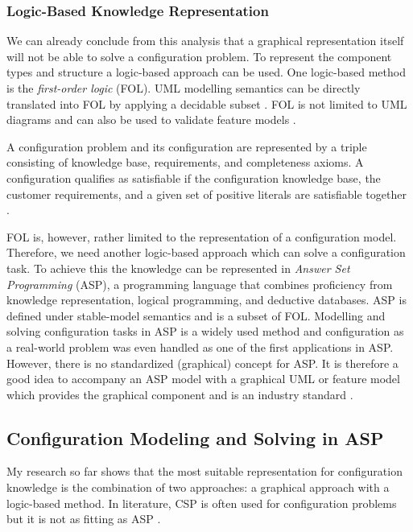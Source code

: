 \subsubsection{Logic-Based Knowledge Representation}

We can already conclude from this analysis that a graphical representation itself will not be able to solve a configuration problem. To represent the component types and structure a logic-based approach can be used. One logic-based method is the \textit{first-order logic} (FOL). UML modelling semantics can be directly translated into FOL by applying a decidable subset \cite{hofestrybawo14a}. FOL is not limited to UML diagrams and can also be used to validate feature models \cite{elphho09a}. \newline

A configuration problem and its configuration are represented by a triple consisting of knowledge base, requirements, and completeness axioms. A configuration qualifies as satisfiable if the configuration knowledge base, the customer requirements, and a given set of positive literals are satisfiable together \cite{hofestrybawo14a}. \newline

FOL is, however, rather limited to the representation of a configuration model. Therefore, we need another logic-based approach which can solve a configuration task. To achieve this the knowledge can be represented in \textit{Answer Set Programming} (ASP), a programming language that combines proficiency from knowledge representation, logical programming, and deductive databases. ASP is defined under stable-model semantics and is a subset of FOL. Modelling and solving configuration tasks in ASP is a widely used method and configuration as a real-world problem was even handled as one of the first applications in ASP. However, there is no standardized (graphical) concept for ASP. It is therefore a good idea to accompany an ASP model with a graphical UML or feature model which provides the graphical component and is an industry standard \cite{hofestrybawo14a}. 

\subsection{Configuration Modeling and Solving in ASP}
My research so far shows that the most suitable representation for configuration knowledge is the combination of two approaches: a graphical approach with a logic-based method. In literature, CSP is often used for configuration problems but it is not as fitting as ASP \cite{fefaateruraz17a}.

